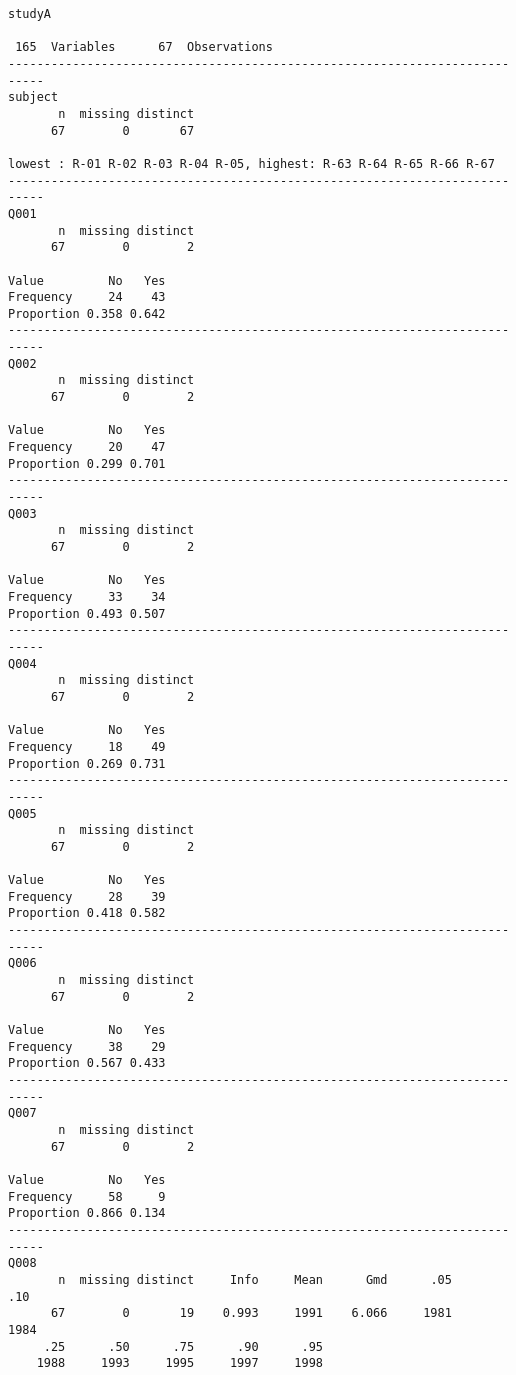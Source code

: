 \documentclass[]{article}
\begin{document}
\begin{verbatim}
studyA 

 165  Variables      67  Observations
---------------------------------------------------------------------------
subject 
       n  missing distinct 
      67        0       67 

lowest : R-01 R-02 R-03 R-04 R-05, highest: R-63 R-64 R-65 R-66 R-67
---------------------------------------------------------------------------
Q001 
       n  missing distinct 
      67        0        2 
                      
Value         No   Yes
Frequency     24    43
Proportion 0.358 0.642
---------------------------------------------------------------------------
Q002 
       n  missing distinct 
      67        0        2 
                      
Value         No   Yes
Frequency     20    47
Proportion 0.299 0.701
---------------------------------------------------------------------------
Q003 
       n  missing distinct 
      67        0        2 
                      
Value         No   Yes
Frequency     33    34
Proportion 0.493 0.507
---------------------------------------------------------------------------
Q004 
       n  missing distinct 
      67        0        2 
                      
Value         No   Yes
Frequency     18    49
Proportion 0.269 0.731
---------------------------------------------------------------------------
Q005 
       n  missing distinct 
      67        0        2 
                      
Value         No   Yes
Frequency     28    39
Proportion 0.418 0.582
---------------------------------------------------------------------------
Q006 
       n  missing distinct 
      67        0        2 
                      
Value         No   Yes
Frequency     38    29
Proportion 0.567 0.433
---------------------------------------------------------------------------
Q007 
       n  missing distinct 
      67        0        2 
                      
Value         No   Yes
Frequency     58     9
Proportion 0.866 0.134
---------------------------------------------------------------------------
Q008 
       n  missing distinct     Info     Mean      Gmd      .05      .10 
      67        0       19    0.993     1991    6.066     1981     1984 
     .25      .50      .75      .90      .95 
    1988     1993     1995     1997     1998 
                                                                      

\end{verbatim}
\end{document}
